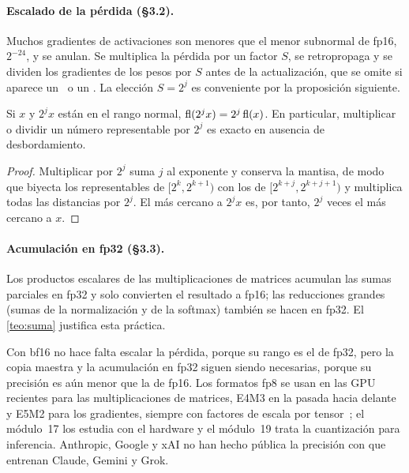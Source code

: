\paragraph{Escalado de la pérdida (§3.2).} Muchos gradientes de activaciones son menores que el menor subnormal de fp16, $2^{-24}$, y se anulan. Se multiplica la pérdida por un factor $S$, se retropropaga y se dividen los gradientes de los pesos por $S$ antes de la actualización, que se omite si aparece un \Inf\ o un \NaN. La elección $S=2^{j}$ es conveniente por la proposición siguiente.

\begin{proposicion}\label{prop:escala}
Si $x$ y $2^{j}x$ están en el rango normal, $\operatorname{fl}(2^{j}x)=2^{j}\operatorname{fl}(x)$. En particular, multiplicar o dividir un número representable por $2^{j}$ es exacto en ausencia de desbordamiento.
\end{proposicion}

\begin{proof}
Multiplicar por $2^{j}$ suma $j$ al exponente y conserva la mantisa, de modo que biyecta los representables de $[2^{k},2^{k+1})$ con los de $[2^{k+j},2^{k+j+1})$ y multiplica todas las distancias por $2^{j}$. El más cercano a $2^{j}x$ es, por tanto, $2^{j}$ veces el más cercano a $x$.
\end{proof}

\paragraph{Acumulación en fp32 (§3.3).} Los productos escalares de las multiplicaciones de matrices acumulan las sumas parciales en fp32 y solo convierten el resultado a fp16; las reducciones grandes (sumas de la normalización y de la softmax) también se hacen en fp32. El \cref{teo:suma} justifica esta práctica.

\begin{observacion}[bf16 y fp8]
Con bf16 no hace falta escalar la pérdida, porque su rango es el de fp32, pero la copia maestra y la acumulación en fp32 siguen siendo necesarias, porque su precisión es aún menor que la de fp16. Los formatos fp8 se usan en las GPU recientes para las multiplicaciones de matrices, E4M3 en la pasada hacia delante y E5M2 para los gradientes, siempre con factores de escala por tensor~\cite{fp8}; el módulo~17 los estudia con el hardware y el módulo~19 trata la cuantización para inferencia. Anthropic, Google y xAI no han hecho pública la precisión con que entrenan Claude, Gemini y Grok.
\end{observacion}

